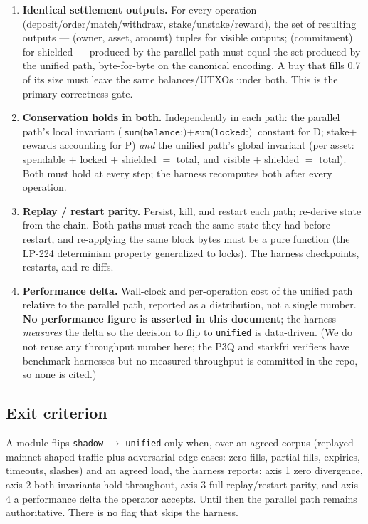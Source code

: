 \begin{enumerate}[leftmargin=2em]
\item \textbf{Identical settlement outputs.} For every operation
  (deposit/order/match/withdraw, stake/unstake/reward), the set of
  resulting outputs --- (owner, asset, amount) tuples for visible
  outputs; (commitment) for shielded --- produced by the parallel path
  must equal the set produced by the unified path, byte-for-byte on the
  canonical encoding. A buy that fills 0.7 of its size must leave the
  same balances/UTXOs under both. This is the primary correctness gate.
\item \textbf{Conservation holds in both.} Independently in each path:
  the parallel path's local invariant
  ($\texttt{sum(balance:)}+\texttt{sum(locked:)}$ constant for D;
  stake$+$rewards accounting for P) \emph{and} the unified path's global
  invariant (per asset: spendable $+$ locked $+$ shielded $=$ total,
  and visible $+$ shielded $=$ total). Both must hold at every step;
  the harness recomputes both after every operation.
\item \textbf{Replay / restart parity.} Persist, kill, and restart each
  path; re-derive state from the chain. Both paths must reach the same
  state they had before restart, and re-applying the same block bytes
  must be a pure function (the LP-224 determinism property generalized
  to locks). The harness checkpoints, restarts, and re-diffs.
\item \textbf{Performance delta.} Wall-clock and per-operation cost of
  the unified path relative to the parallel path, reported as a
  distribution, not a single number. \textbf{No performance figure is
  asserted in this document}; the harness \emph{measures} the delta so
  the decision to flip to \texttt{unified} is data-driven. (We do not
  reuse any throughput number here; the P3Q and starkfri verifiers have
  benchmark harnesses but no measured throughput is committed in the
  repo, so none is cited.)
\end{enumerate}

\subsection{Exit criterion}

A module flips \texttt{shadow} $\to$ \texttt{unified} only when, over an
agreed corpus (replayed mainnet-shaped traffic plus adversarial edge
cases: zero-fills, partial fills, expiries, timeouts, slashes) and an
agreed load, the harness reports: axis 1 zero divergence, axis 2 both
invariants hold throughout, axis 3 full replay/restart parity, and axis
4 a performance delta the operator accepts. Until then the parallel path
remains authoritative. There is no flag that skips the harness.
